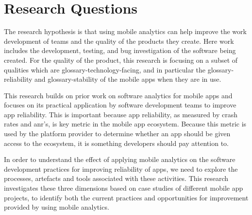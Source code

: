 \section{Research Questions}
\label{section-research-questions}



The research hypothesis is that using mobile analytics can help improve the work development of teams and the quality of the products they create. Here work includes the development, testing, and bug investigation of the software being created. For the quality of the product, this research is focusing on a subset of qualities which are \gls{glossary-technology-facing}, %
and in particular the \gls{glossary-reliability} and \gls{glossary-stability} of the mobile apps when they are in use. 

This research builds on prior work on software analytics for mobile apps and focuses on its practical application by software development teams to improve app reliability. This is important because app reliability, as measured by crash rates and \acrshort{anr}'s, is key metric in the mobile app ecosystem. Because this metric is used by the platform provider to determine whether an app should be given access to the ecosystem, it is something developers should pay attention to. 

In order to understand the effect of applying mobile analytics on the software development practices for improving reliability of apps, we need to explore the processes, artefacts and tools associated with these activities. This research investigates these three dimensions based on case studies of different mobile app projects, to identify both the current practices and opportunities for improvement provided by using mobile analytics.


